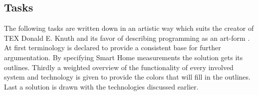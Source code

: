 
\subsection{Tasks}
	The following tasks are written down in an artistic way which suits the creator of TEX Donald E. Knuth and its favor of describing programming as an art-form \parencite{Knuth}.
	At first terminology is declared to provide a consistent base for further argumentation. By specifying Smart Home measurements the solution gets its outlines. Thirdly a weighted overview of the functionality of every involved system and technology is given to provide the colors that will fill in the outlines. Last a solution is drawn with the technologies discussed earlier.

\pagebreak

